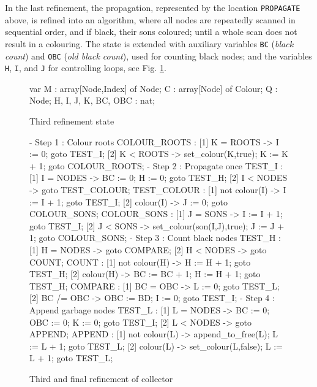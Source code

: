 In the last refinement,  the propagation, represented by  the location
{\tt PROPAGATE}  above, is refined into an  algorithm, where all nodes
are repeatedly  scanned in sequential  order, and if black, their sons
coloured;  until a  whole scan  does not  result in  a colouring.  The
state   is  extended with auxiliary  variables   {\tt  BC} ({\em black
  count}) and {\tt OBC}   ({\em old black  count}), used  for counting
black  nodes; and the  variables {\tt  H}, {\tt I},   and {\tt J}  for
controlling loops, see Fig. \ref{refinement3-state}.

\begin{figure}[htb]
\begin{smallsession}
  var
    M   : array[Node,Index] of Node;
    C   : array[Node] of Colour;
    Q   : Node;
    H, I, J, K, BC, OBC : nat;
\end{smallsession}
\caption{Third refinement state}
\label{refinement3-state}
\end{figure}

\begin{figure}[htb]
\begin{smallsession}
- Step 1 : Colour roots
  COLOUR_ROOTS : 
    [1] K = ROOTS -> I := 0; goto TEST_I;
    [2] K < ROOTS -> set_colour(K,true); K := K + 1; goto COLOUR_ROOTS;
- Step 2 : Propagate once
  TEST_I :
    [1] I = NODES -> BC := 0; H := 0; goto TEST_H;
    [2] I < NODES -> goto TEST_COLOUR;
  TEST_COLOUR :
    [1] not colour(I) -> I := I + 1; goto TEST_I;
    [2] colour(I)  -> J := 0; goto COLOUR_SONS;
  COLOUR_SONS :
    [1] J = SONS -> I := I + 1; goto TEST_I;
    [2] J < SONS -> set_colour(son(I,J),true); J := J + 1; 
        goto COLOUR_SONS;
- Step 3 : Count black nodes
  TEST_H :
    [1] H = NODES -> goto COMPARE;
    [2] H < NODES -> goto COUNT;
  COUNT :
    [1] not colour(H) -> H := H + 1; goto TEST_H;
    [2] colour(H) -> BC := BC + 1; H := H + 1; goto TEST_H;
  COMPARE :
    [1] BC = OBC -> L := 0; goto TEST_L;
    [2] BC /= OBC -> OBC := BD; I := 0; goto TEST_I;
- Step 4 : Append garbage nodes
  TEST_L :
    [1] L = NODES -> BC := 0; OBC := 0; K := 0; goto TEST_I;
    [2] L < NODES -> goto APPEND;
  APPEND :
    [1] not colour(L) -> append_to_free(L); L := L + 1; goto TEST_L;
    [2] colour(L) -> set_colour(L,false); L := L + 1; goto TEST_L; 
\end{smallsession}
\caption{Third and final refinement of collector}
\label{refinement3-collector}
\end{figure}

